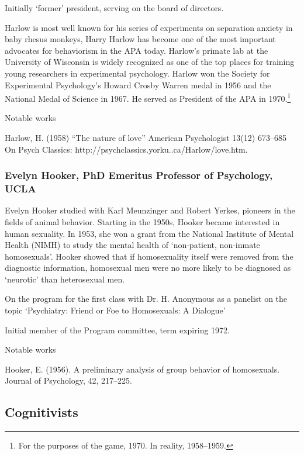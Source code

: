 Initially `former' president, serving on the board of directors.

Harlow is most well known for his series of experiments on separation anxiety in baby rhesus monkeys, Harry Harlow has become one of the most important advocates for behaviorism in the APA today. Harlow's primate lab at the University of Wisconsin is widely recognized as one of the top places for training young researchers in experimental psychology. Harlow won the Society for Experimental Psychology's Howard Crosby Warren medal in 1956 and the National Medal of Science in 1967. He served as President of the APA in 1970.\footnote{For the purposes of the game, 1970. In reality, 1958--1959.} 

Notable works

Harlow, H. (1958) “The nature of love” American Psychologist 13(12) 673--685 On Psych Classics: http:\slash \slash psychclassics.yorku..ca\slash Harlow\slash love.htm.

\subsubsection{Evelyn Hooker, PhD Emeritus Professor of Psychology, UCLA}
\label{evelynhookerphdemeritusprofessorofpsychologyucla}

Evelyn Hooker studied with Karl Meunzinger and Robert Yerkes, pioneers in the fields of animal behavior. Starting in the 1950s, Hooker became interested in human sexuality. In 1953, she won a grant from the National Institute of Mental Health (NIMH) to study the mental health of `non-patient, non-inmate homosexuals'. Hooker showed that if homosexuality itself were removed from the diagnostic information, homosexual men were no more likely to be diagnosed as `neurotic' than heterosexual men.

On the program for the first class with Dr. H. Anonymous as a panelist on the topic `Psychiatry: Friend or Foe to Homosexuals: A Dialogue'

Initial member of the Program committee, term expiring 1972.

Notable works

Hooker, E. (1956). A preliminary analysis of group behavior of homosexuals. Journal of Psychology, 42, 217--225.

\subsection{Cognitivists}
\label{cognitivists}


